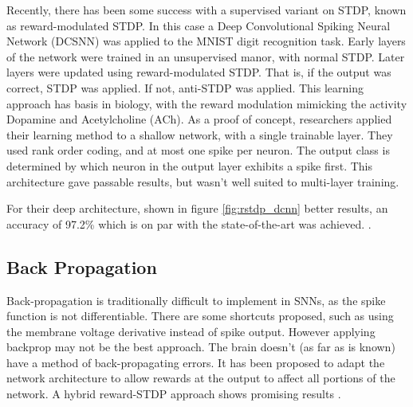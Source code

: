     Recently, there has been some success with a supervised variant on STDP,
    known as reward-modulated STDP. In this case a Deep Convolutional Spiking
    Neural Network (DCSNN) was applied to the MNIST digit recognition
    task. Early layers of the network were trained in an unsupervised manor,
    with normal STDP. Later layers were updated using reward-modulated
    STDP. That is, if the output was correct, STDP was applied. If not,
    anti-STDP was applied. This learning approach has basis in biology, with the
    reward modulation mimicking the activity Dopamine and Acetylcholine
    (ACh). As a proof of concept, researchers applied their learning method to a
    shallow network, with a single trainable layer. They used rank order coding,
    and at most one spike per neuron. The output class is determined by which
    neuron in the output layer exhibits a spike first. This architecture gave
    passable results, but wasn't well suited to multi-layer training.
    
    For their deep architecture, shown in figure \ref{fig:rstdp_dcnn} better
    results, an accuracy of 97.2\% which is on par with the state-of-the-art was
    achieved. \cite{mozafari_2018}.
    
    
    
    
    \subsection{Back Propagation}
    
    Back-propagation is traditionally difficult to implement in SNNs, as the
    spike function is not differentiable. There are some shortcuts proposed,
    such as using the membrane voltage derivative instead of spike
    output. However applying backprop may not be the best approach. The brain
    doesn't (as far as is known) have a method of back-propagating errors. It
    has been proposed to adapt the network architecture to allow rewards at the
    output to affect all portions of the network. A hybrid reward-STDP approach
    shows promising results \cite{tavanaei_2019}.
    
